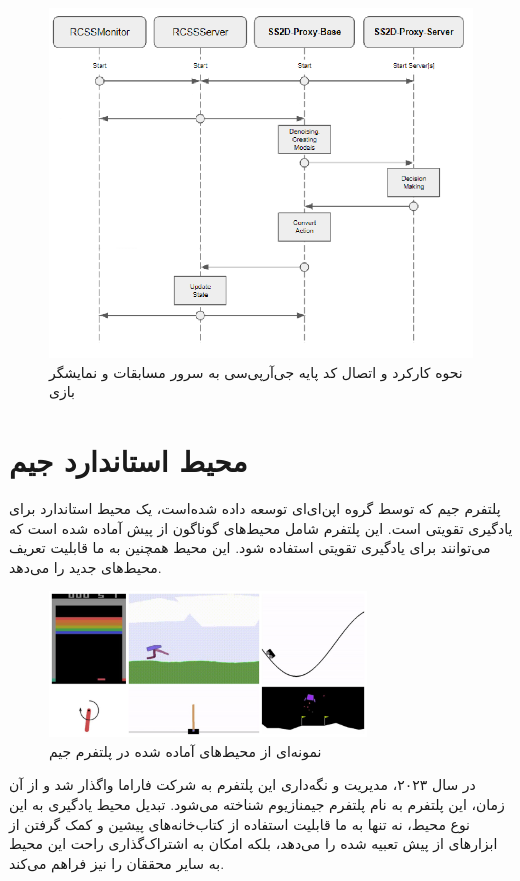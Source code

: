 \begin{figure}[H]
    \centering
    \includegraphics[width=1\textwidth]{images/grpc_base.png}
    \caption{نحوه کارکرد و اتصال کد پایه جی‌آر‌پی‌سی به سرور مسابقات و نمایشگر بازی}\label{fig:grpc_base}
    
\end{figure}
\section{محیط استاندارد جیم}
پلتفرم جیم
که توسط گروه اپن‌ای‌ای
توسعه داده شده‌است،
یک محیط استاندارد برای یادگیری تقویتی است.
این پلتفرم شامل محیط‌های گوناگون از پیش آماده شده است که می‌توانند برای یادگیری تقویتی استفاده شود.
این محیط همچنین به ما قابلیت تعریف محیط‌های جدید را می‌دهد.
\begin{figure}
    \centering
    \includegraphics[width=0.75\textwidth]{images/openaigym.jpg}
    \caption{نمونه‌ای از محیط‌های آماده شده در پلتفرم جیم}\label{fig:gym}
    
\end{figure}
در سال ۲۰۲۳، 
مدیریت و نگه‌داری این پلتفرم به شرکت فاراما
واگذار شد و از آن زمان، این پلتفرم به نام پلتفرم جیمنازیوم
 شناخته می‌شود.
تبدیل محیط یادگیری به این نوع محیط، نه تنها به ما قابلیت استفاده از کتاب‌خانه‌های پیشین و کمک گرفتن از ابزار‌های
از پیش تعبیه شده را می‌دهد، بلکه امکان به اشتراک‌گذاری راحت این محیط به سایر محققان را نیز فراهم می‌کند.
